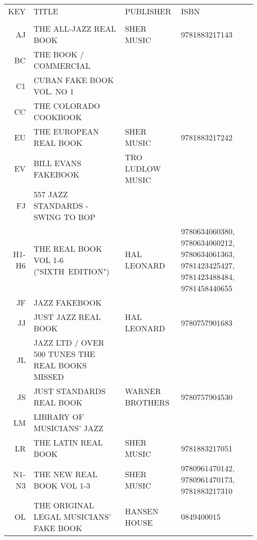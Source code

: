 \documentclass[8pt]{scrartcl}
\begin{document}
\selectfont
\begin{center}
  \begin{tabular}{rp{}p{}p{}}%
    KEY   & TITLE                                           & PUBLISHER          & ISBN \\
          &                                                 &                    & \\
    AJ    & THE ALL-JAZZ REAL BOOK                          & SHER MUSIC         & 9781883217143 \\
    BC    & THE BOOK / COMMERCIAL                           &                    & \\
    C1    & CUBAN FAKE BOOK VOL. NO 1                       &                    & \\
    CC    & THE COLORADO COOKBOOK                           &                    & \\
    EU    & THE EUROPEAN REAL BOOK                          & SHER MUSIC         & 9781883217242 \\
    EV    & BILL EVANS FAKEBOOK                             & TRO LUDLOW MUSIC   & \\
    FJ    & 557 JAZZ STANDARDS - SWING TO BOP               &                    & \\
    H1-H6 & THE REAL BOOK VOL 1-6 ("SIXTH~EDITION")         & HAL LEONARD        & 9780634060380, 9780634060212, 9780634061363, 9781423425427, 9781423488484, 9781458440655 \\
    JF    & JAZZ FAKEBOOK                                   &                    & \\
    JJ    & JUST JAZZ REAL BOOK                             & HAL LEONARD        & 9780757901683 \\
    JL    & JAZZ LTD / OVER 500 TUNES THE REAL BOOKS MISSED &                    & \\
    JS    & JUST STANDARDS REAL BOOK                        & WARNER BROTHERS    & 9780757904530 \\
    LM    & LIBRARY OF MUSICIANS’ JAZZ                      &                    & \\
    LR    & THE LATIN REAL BOOK                             & SHER MUSIC         & 9781883217051 \\
    N1-N3 & THE NEW REAL BOOK VOL 1-3                       & SHER MUSIC         & 9780961470142, 9780961470173, 9781883217310 \\
    OL    & THE ORIGINAL LEGAL MUSICIANS' FAKE BOOK         & HANSEN HOUSE       & 0849400015 \\

\end{tabular}
\end{center}
\end{document}
